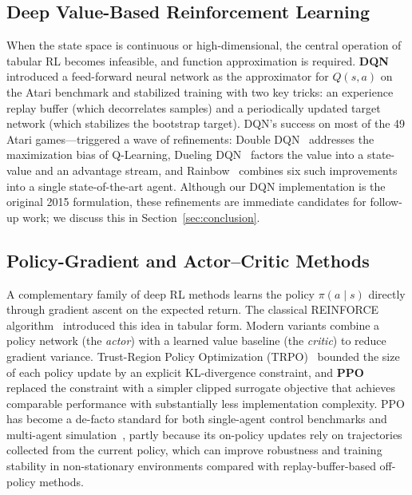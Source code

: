 \documentclass[conference]{IEEEtran}
\begin{document}
\subsection{Deep Value-Based Reinforcement Learning}

When the state space is continuous or high-dimensional, the central
operation of tabular RL becomes
infeasible, and function approximation is required. \textbf{DQN}
\cite{mnih2015} introduced a feed-forward neural network as the
approximator for $Q(s, a)$ on the Atari benchmark and stabilized
training with two key tricks: an experience replay buffer (which
decorrelates samples) and a periodically updated target network
(which stabilizes the bootstrap target). DQN's success on most of the 49 Atari games---triggered a wave of refinements: Double DQN~\cite{vanhasselt2016} addresses
the maximization bias of Q-Learning, Dueling DQN~\cite{wang2016}
factors the value into a state-value and an advantage stream, and
Rainbow~\cite{hessel2018} combines six such improvements into a
single state-of-the-art agent. Although our DQN implementation is the
original 2015 formulation, these refinements are immediate candidates
for follow-up work; we discuss this in Section~\ref{sec:conclusion}.

\subsection{Policy-Gradient and Actor--Critic Methods}

A complementary family of deep RL methods learns the policy
$\pi(a \mid s)$ directly through gradient ascent on the expected
return. The classical REINFORCE algorithm~\cite{williams1992}
introduced this idea in tabular form. Modern variants combine a
policy network (the \emph{actor}) with a learned value baseline
(the \emph{critic}) to reduce gradient variance. Trust-Region Policy
Optimization (TRPO)~\cite{schulman2015} bounded the size of each
policy update by an explicit KL-divergence constraint, and
\textbf{PPO}~\cite{schulman2017} replaced the constraint with a
simpler clipped surrogate objective that achieves comparable
performance with substantially less implementation complexity. PPO has become a de-facto standard for both single-agent control benchmarks and multi-agent simulation~\cite{yu2022}, partly because its on-policy updates rely on trajectories collected from the current policy, which can improve robustness and training stability in non-stationary environments compared with replay-buffer-based off-policy methods.
\end{document}
